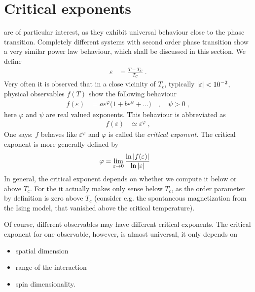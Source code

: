 \section{Critical exponents\label{sec:critical:exponents}}
 are of particular interest, as they exhibit universal behaviour close 
to the phase transition. Completely different systems with second order phase transition
show a very similar power law behaviour, which shall be discussed in this section. 
We define 
%
\begin{align*}
\varepsilon &=\frac{T-T_{C}}{T_{C}}\;.
\end{align*}
%
Very often it is observed that in a close vicinity of $T_{c}$, typically
$\abs{\varepsilon} < 10^{-2}$,
%
physical observables $f(T)$ show the following behaviour
%
\begin{align*}
f(\varepsilon) &= a \varepsilon^{\varphi} \big( 1 +  b \varepsilon^{\psi} +\ldots\big)\quad , \quad\psi>0\;,
\end{align*}
%
here $\varphi$ and $\psi$ are real valued exponents. This behaviour is abbreviated as
%
\begin{align}
f(\varepsilon) &\simeq \varepsilon^{\varphi}\;,
\end{align}
%
One says: $f$ behaves like $\varepsilon^{\varphi}$ and $\varphi$ is called the {\em critical exponent}.
The critical exponent is more generally defined by
%
\begin{align}\label{def:critical:exponent}
\varphi &= \lim_{\varepsilon\to 0} \frac{
\ln \abs{f(\varepsilon)} }{\ln \abs{\varepsilon}}
\end{align}
%
In general, the critical exponent depends on whether we compute it below or above $T_{c}$.
For the  it actually makes only sense below  $T_{c}$, as the order parameter
by definition is zero above $T_{c}$ (consider e.g. the spontaneous magnetization from the Ising model, that vanished above the critical temperature).

Of course, different observables may have different critical exponents. The critical exponent for 
one observable, however, is almost universal, it only depends on
\begin{itemize}
	\item spatial dimension
	\item range of the interaction
	\item spin dimensionality.
\end{itemize}

